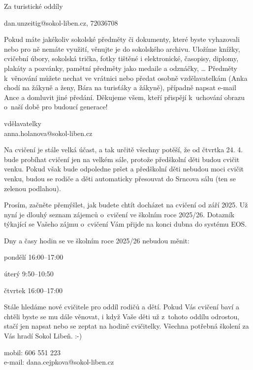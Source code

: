 \documentclass[11pt]{article}
\begin{document}
\noindent
Za turistické oddíly

\signature{Dan Unzeitig (Kondor)}{dan.unzeitig@sokol-liben.cz, 72036708}

\vspace*{24pt}


Pokud máte jakékoliv sokolské předměty či dokumenty, které byste vyhazovali nebo pro ně nemáte využití, věnujte je do sokolského archivu. Uložíme knížky, cvičební úbory, sokolská trička, fotky tištěné i elektronické, časopisy, diplomy, plakáty a pozvánky, pamětní předměty jako medaile a odznáčky, \ldots{}
Předměty k~věnování můžete nechat ve vrátnici nebo předat osobně vzdělavatelkám (Anka chodí na žákyně a ženy, Bára na turisťáky a žákyně), případně napsat e-mail Ance a domluvit jiné předání.
Děkujeme všem, kteří přispějí k~uchování obrazu o~naší době pro budoucí generace!

\signature{Anka Holanová a Bára Jeníková}{vdělavatelky \\ anna.holanova@sokol-liben.cz}

\vspace*{24pt}

Na cvičení je stále velká účast, a tak určitě všechny potěší, že od čtvrtka 24. 4. bude probíhat cvičení jen na velkém sále, protože předškolní děti budou cvičit venku. Pokud však bude odpoledne pršet a předškolní děti nebudou moci cvičit venku, budou se rodiče a děti automaticky přesouvat do Srncova sálu (ten se zelenou podlahou).

Prosím, začněte přemýšlet, jak budete chtít docházet na cvičení od září 2025. Už nyní je dlouhý seznam zájemců o~cvičení ve školním roce 2025/26. Dotazník týkající se Vašeho zájmu o~cvičení Vám přijde na konci dubna do systému EOS.

\noindent Dny a časy hodin se ve školním roce 2025/26 nebudou měnit:

pondělí 16:00–17:00 

úterý 9:50–10:50 

čtvrtek 16:00–17:00 

Stále hledáme nové cvičitele pro oddíl rodičů a dětí. Pokud Vás cvičení baví a chtěli byste se mu dále věnovat, i když Vaše děti už z~tohoto oddílu odrostou, stačí jen napsat nebo se zeptat na hodině cvičitelky. Všechna potřebná školení za Vás hradí Sokol Libeň. :-)

\signature{Dana Cejpková}{mobil: 606 551 223\\e-mail: dana.cejpkova@sokol-liben.cz}
\end{document}
